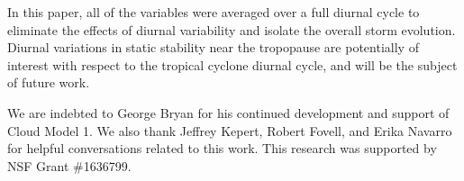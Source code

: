 \documentclass{ametsoc}
\begin{document}
In this paper, all of the variables were averaged over a full diurnal cycle to eliminate the effects of diurnal variability and isolate the overall storm evolution.
Diurnal variations in static stability near the tropopause are potentially of interest with respect to the tropical cyclone diurnal cycle, and will be the subject of future work.








%
\acknowledgments
We are indebted to George Bryan for his continued development and support of Cloud Model 1.
We also thank Jeffrey Kepert, Robert Fovell, and Erika Navarro for helpful conversations related to this work.
This research was supported by NSF Grant \#1636799.
\end{document}
